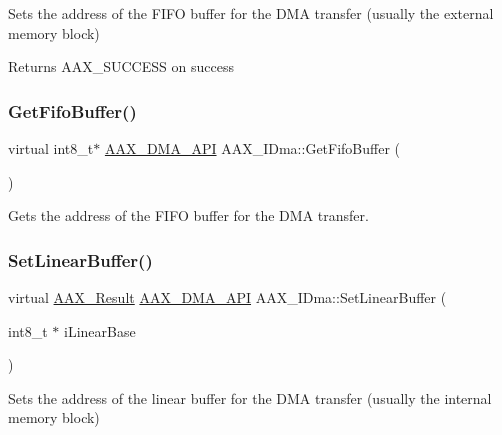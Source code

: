 Sets the address of the F\+I\+FO buffer for the D\+MA transfer (usually the external memory block) 

\begin{DoxyReturn}{Returns}
{\ttfamily A\+A\+X\+\_\+\+S\+U\+C\+C\+E\+SS} on success 
\end{DoxyReturn}
\mbox{\label{a01809_af5c4988d5f844b219077773e4e810d64}} 
\subsubsection{\texorpdfstring{GetFifoBuffer()}{GetFifoBuffer()}}
{\footnotesize\ttfamily virtual int8\+\_\+t$\ast$ \mbox{\hyperlink{a00587_acae60d01e5e4bd3282369d0d9d378f3f}{A\+A\+X\+\_\+\+D\+M\+A\+\_\+\+A\+PI}} A\+A\+X\+\_\+\+I\+Dma\+::\+Get\+Fifo\+Buffer (\begin{DoxyParamCaption}{ }\end{DoxyParamCaption})\hspace{0.3cm}{\ttfamily [pure virtual]}}



Gets the address of the F\+I\+FO buffer for the D\+MA transfer. 

\mbox{\label{a01809_ad0c409f61f989e72f6afd47cb02b108e}} 
\subsubsection{\texorpdfstring{SetLinearBuffer()}{SetLinearBuffer()}}
{\footnotesize\ttfamily virtual \mbox{\hyperlink{a00392_a4d8f69a697df7f70c3a8e9b8ee130d2f}{A\+A\+X\+\_\+\+Result}} \mbox{\hyperlink{a00587_acae60d01e5e4bd3282369d0d9d378f3f}{A\+A\+X\+\_\+\+D\+M\+A\+\_\+\+A\+PI}} A\+A\+X\+\_\+\+I\+Dma\+::\+Set\+Linear\+Buffer (\begin{DoxyParamCaption}\item[{int8\+\_\+t $\ast$}]{i\+Linear\+Base }\end{DoxyParamCaption})\hspace{0.3cm}{\ttfamily [pure virtual]}}



Sets the address of the linear buffer for the D\+MA transfer (usually the internal memory block) 

